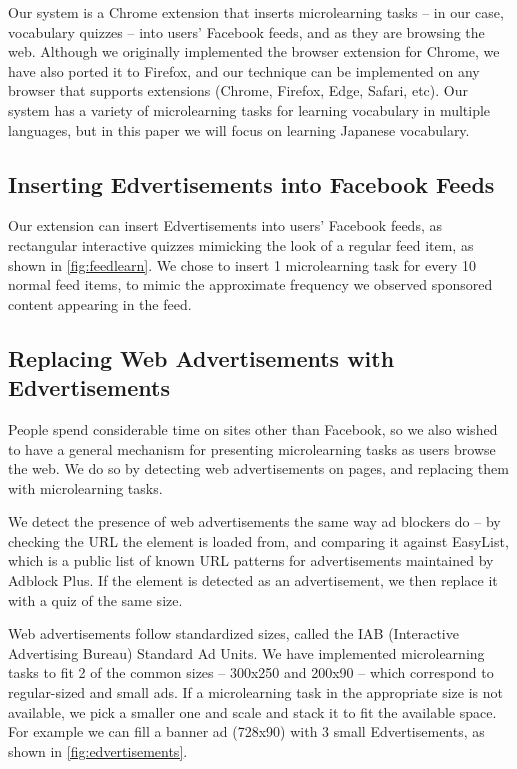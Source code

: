 \documentclass{sigchi}
\begin{document}
Our system is a Chrome extension that inserts microlearning tasks -- in our case, vocabulary quizzes -- into users' Facebook feeds, and as they are browsing the web. Although we originally implemented the browser extension for Chrome, we have also ported it to Firefox, and our technique can be implemented on any browser that supports extensions (Chrome, Firefox, Edge, Safari, etc). Our system has a variety of microlearning tasks for learning vocabulary in multiple languages, but in this paper we will focus on learning Japanese vocabulary.



\subsection{Inserting Edvertisements into Facebook Feeds}

Our extension can insert Edvertisements into users' Facebook feeds, as rectangular interactive quizzes mimicking the look of a regular feed item, as shown in \autoref{fig:feedlearn}. We chose to insert 1 microlearning task for every 10 normal feed items, to mimic the approximate frequency we observed sponsored content appearing in the feed.

\subsection{Replacing Web Advertisements with Edvertisements}

People spend considerable time on sites other than Facebook, so we also wished to have a general mechanism for presenting microlearning tasks as users browse the web. We do so by detecting web advertisements on pages, and replacing them with microlearning tasks.

We detect the presence of web advertisements the same way ad blockers do -- by checking the URL the element is loaded from, and comparing it against EasyList, which is a public list of known URL patterns for advertisements maintained by Adblock Plus. If the element is detected as an advertisement, we then replace it with a quiz of the same size.

Web advertisements follow standardized sizes, called the IAB (Interactive Advertising Bureau) Standard Ad Units.
We have implemented microlearning tasks to fit 2 of the common sizes -- 300x250 and 200x90 -- which correspond to regular-sized and small ads.  If a microlearning task in the appropriate size is not available, we pick a smaller one and scale and stack it to fit the available space. For example we can fill a banner ad (728x90) with 3 small Edvertisements, as shown in \autoref{fig:edvertisements}. %
\end{document}
